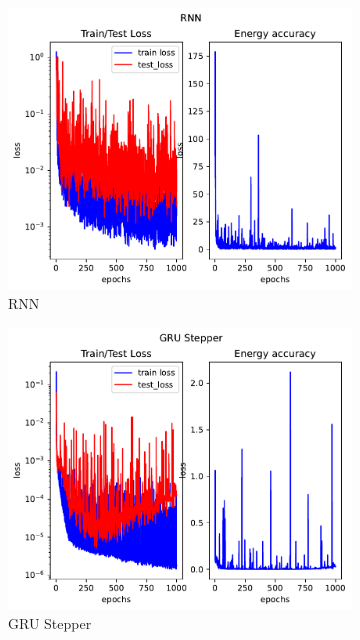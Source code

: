 \begin{figure}[H]
	\begin{subfigure}[b]{0.3\textwidth}
		\centering
		\includegraphics[width=\textwidth]{chapters/chapter5/osci_rnn_loss.pdf}
		\caption{RNN}
	\end{subfigure}
	\hfill
	\begin{subfigure}[b]{0.3\textwidth}
		\centering
		\includegraphics[width=\textwidth]{chapters/chapter5/osci_gre_loss.pdf}
		\caption{GRU Stepper}
	\end{subfigure}
	\hfill
	\begin{subfigure}[b]{0.3\textwidth}
		\centering

\end{subfigure}
\end{figure}

